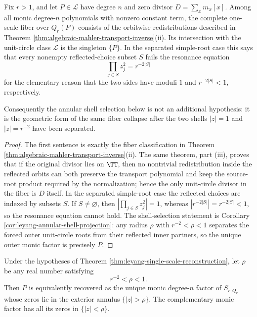 \begin{corollary}\label{cor:no-resonance-leyang-fiber-collapse}
Fix \(r>1\), and let \(P\in\mathcal L\) have degree \(n\) and zero divisor \(D=\sum_xm_x[x]\).  Among all monic degree-\(n\) polynomials with nonzero constant term, the complete one-scale fiber over \(Q_r(P)\) consists of the orbitwise redistributions described in Theorem \ref{thm:algebraic-mahler-transport-inverse}\textup{(ii)}.  Its intersection with the unit-circle class \(\mathcal L\) is the singleton \(\{P\}\).  In the separated simple-root case this says that every nonempty reflected-choice subset \(S\) fails the resonance equation
\[
\prod_{j\in S}z_j^2=r^{-2|S|}
\]
for the elementary reason that the two sides have moduli \(1\) and \(r^{-2|S|}<1\), respectively.

Consequently the annular shell selection below is not an additional hypothesis: it is the geometric form of the same fiber collapse after the two shells \(|z|=1\) and \(|z|=r^{-2}\) have been separated.
\end{corollary}

\begin{proof}
The first sentence is exactly the fiber classification in Theorem \ref{thm:algebraic-mahler-transport-inverse}\textup{(ii)}.  The same theorem, part \textup{(iii)}, proves that if the original divisor lies on \(\TT\), then no nontrivial redistribution inside the reflected orbits can both preserve the transport polynomial and keep the source-root product required by the normalization; hence the only unit-circle divisor in the fiber is \(D\) itself.  In the separated simple-root case the reflected choices are indexed by subsets \(S\).  If \(S\ne\varnothing\), then \(|\prod_{j\in S}z_j^2|=1\), whereas \(|r^{-2|S|}|=r^{-2|S|}<1\), so the resonance equation cannot hold.  The shell-selection statement is Corollary \ref{cor:leyang-annular-shell-projection}: any radius \(\rho\) with \(r^{-2}<\rho<1\) separates the forced outer unit-circle roots from their reflected inner partners, so the unique outer monic factor is precisely \(P\).
\end{proof}

\begin{corollary}\label{cor:leyang-annular-shell-projection}
Under the hypotheses of Theorem \ref{thm:leyang-single-scale-reconstruction}, let \(\rho\) be any real number satisfying
\[
r^{-2}<\rho<1.
\]
Then \(P\) is equivalently recovered as the unique monic degree-\(n\) factor of \(S_{r,Q_r}\) whose zeros lie in the exterior annulus \(\{|z|>\rho\}\).  The complementary monic factor has all its zeros in \(\{|z|<\rho\}\).
\end{corollary}

